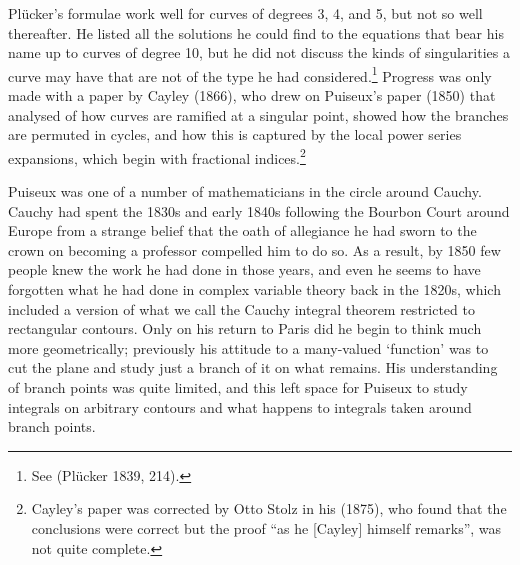 \documentclass[11pt]{article}
\begin{document}
Pl\"ucker's formulae work well for curves of degrees 3, 4, and 5, but not so well thereafter.  He listed all the solutions he could find to the equations that bear his name up to curves of degree 10, but he did not discuss the kinds of singularities a curve may have that are not of the type he had considered.\footnote{See (Pl\"ucker 1839, 214).}  Progress was only made with a paper by Cayley (1866), who drew on Puiseux's paper (1850) that analysed  of how curves are ramified at a singular point,  showed how the branches are permuted in cycles, and how this is captured by the local power series expansions, which begin with fractional indices.\footnote{Cayley's paper was corrected by Otto Stolz in his (1875), who found that the conclusions were correct but the proof ``as he [Cayley] himself remarks'', was not quite complete.}

Puiseux was one of a number of mathematicians in the circle around Cauchy. Cauchy had spent the 1830s and early 1840s following the Bourbon Court around Europe from a strange belief that the oath of allegiance he had sworn to the crown on becoming a professor compelled him to do so. As a result, by 1850 few people knew the work he had done in those years, and even he seems to have forgotten what he had done in complex variable theory back in the 1820s, which included a version of what we call the Cauchy integral theorem restricted to rectangular contours. Only on his return to Paris did he begin to think much more geometrically; previously his attitude to a many-valued `function' was to cut the plane and study just a branch of it on what remains. His understanding of branch points was quite limited, and this left space for Puiseux to study integrals on arbitrary contours   and what happens to integrals taken around branch points. 
\end{document}
